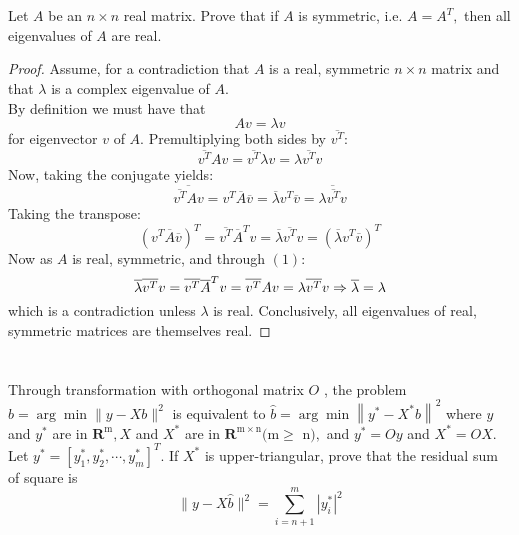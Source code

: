 \documentclass[12pt]{article}
\newcommand{\RA}{\Rightarrow}
\begin{document}
	\section{}
	 Let $A$ be an $n \times n$ real matrix. Prove that if $A$ is symmetric, i.e. $A=A^{T},$ then all eigenvalues of $A$ are real.
	\medskip
	\begin{proof}
		Assume, for a contradiction that $ A $ is a real, symmetric $ n \times n $ matrix and that $ \lambda $ is a complex eigenvalue of $ A $.\\
		By definition we must have that \begin{equation}
			Av=\lambda v
		\end{equation}
		for eigenvector $ v $ of $ A $. 
		Premultiplying both sides by $ \overline{v^T} $: \[  \overline{v^T}Av= \overline{v^T}\lambda v= \lambda  \overline{v^T} v \]
		Now, taking the conjugate yields: \[ \overline{ \overline{v^T} Av } = v^T\overline{A}\overline{v}=\overline{\lambda} v^T \overline{v} = \overline{\lambda \overline{v^T} v} \]
		Taking the transpose: \[ (v^T\overline{A}\overline{v})^T= \overline{v^T}\overline{A}^Tv= \overline{\lambda}\overline{v^T}v=(\overline{\lambda} v^T \overline{v})^T \]
		Now as $ A $ is real, symmetric, and through $ (1) $: 
		\[ \overline{\lambda}\overline{v^T}v = \overline{v^T}\overline{A}^Tv=\overline{v^T}Av = \lambda  \overline{v^T} v \\ \RA \overline{\lambda} = \lambda \] 
		which is a contradiction unless $ \lambda  $ is real. Conclusively, all eigenvalues of real, symmetric matrices are themselves real.  
	\end{proof}	 
		
	\section{}
		Through transformation with orthogonal matrix $O$ , the problem $\hat{b}=\arg \min \|y-X b\|^{2}$
		is equivalent to $\hat{b}=\arg \min \left\|y^{*}-X^{*} b\right\|^{2}$ where $y$ and $y^{*}$ are in $\mathbf{R}^{\mathrm{m}}, X$ and $X^{*}$ are in $\mathbf{R}^{\mathrm{m} \times \mathrm{n}}(\mathrm{m} \geq$
		$\mathrm{n}),$ and $y^{*}=O y$ and $X^{*}=O X .$ Let $y^{*}=\left[y_{1}^{*}, y_{2}^{*}, \cdots, y_{m}^{*}\right]^{T} .$ If $X^{*}$ is upper-triangular, prove that the
		residual sum of square is
		\[ \|y-X \hat{b}\|^{2}=\sum_{i=n+1}^{m}\left|y_{i}^{*}\right|^{2} \]
		
\end{document}
